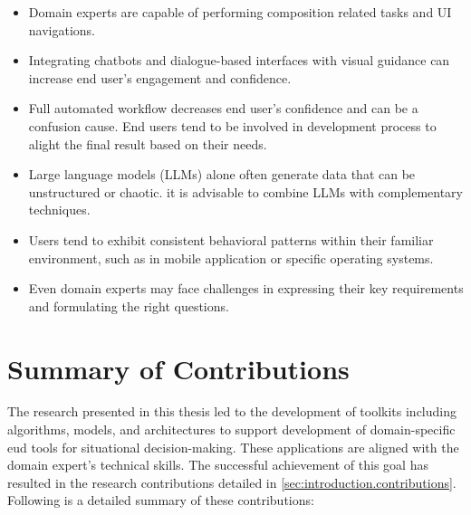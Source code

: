 \begin{itemize}
\tightlist
\item
  Domain experts are capable of performing composition related tasks and UI navigations. 
\item
  Integrating chatbots and dialogue-based interfaces with visual
  guidance can increase end user's engagement and confidence.
\item
  Full automated workflow decreases end user's confidence and can be a
  confusion cause. End users tend to be involved in development process
  to alight the final result based on their needs.
\item
  Large language models (LLMs) alone often generate data that can be
  unstructured or chaotic. it is advisable to combine LLMs with
  complementary techniques.
\item
  Users tend to exhibit consistent behavioral patterns within their
  familiar environment, such as in mobile application or specific
  operating systems.
\item
  Even domain experts may face challenges in expressing their key
  requirements and formulating the right questions.
\end{itemize}


\hypertarget{sec:conclusion.contributions}{%
\section{Summary of Contributions}\label{sec:conclusion.contributions}}
\vspace{15pt}

The research presented in this thesis led to the development of toolkits including algorithms, models, and architectures to support development of domain-specific \gls{eud} tools for situational decision-making. These applications are aligned with the domain expert’s technical skills. The successful achievement of this goal has resulted in the research contributions detailed in \cref{sec:introduction.contributions}. Following is a detailed summary of these contributions: 

